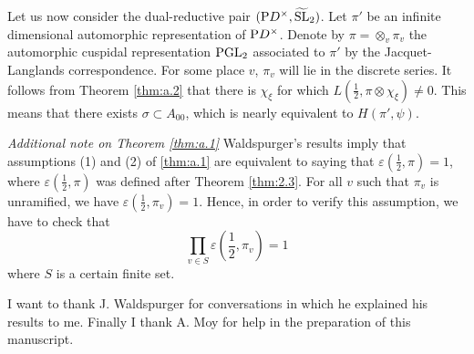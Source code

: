\begin{appendices}
Let us now consider the dual-reductive pair $(\mathrm{P} D^\times, \widetilde{\mathrm{SL}}_2)$.
Let $\pi'$ be an infinite dimensional automorphic representation of $\mathrm{P} D^\times$.
Denote by $\pi = \otimes_v \pi_v$ the automorphic cuspidal representation $\mathrm{PGL}_2$ associated to $\pi'$ by the Jacquet-Langlands correspondence.
For some place $v$, $\pi_v$ will lie in the discrete series. It follows from Theorem \ref{thm:a.2} that there is $\chi_\xi$ for which $L(\frac{1}{2}, \pi \otimes \chi_\xi) \neq 0$.
This means that there exists $\sigma \subset A_{00}$, which is nearly equivalent to $H(\pi', \psi)$.

\emph{Additional note on Theorem \ref{thm:a.1}}
Waldspurger's results \cite{waldspurger91quaternion} imply that assumptions (1) and (2) of \ref{thm:a.1} are equivalent to saying that $\varepsilon(\frac{1}{2}, \pi) = 1$, where $\varepsilon(\frac{1}{2}, \pi)$ was defined after Theorem \ref{thm:2.3}.
For all $v$ such that $\pi_v$ is unramified, we have $\varepsilon(\frac{1}{2}, \pi_v) = 1$.
Hence, in order to verify this assumption, we have to check that
\[
\prod_{v \in S} \varepsilon\left(\frac{1}{2}, \pi_v\right) = 1
\]
where $S$ is a certain finite set.

I want to thank J. Waldspurger for conversations in which he explained his results to me. Finally I thank A. Moy for help in the preparation of this manuscript.
\end{appendices}